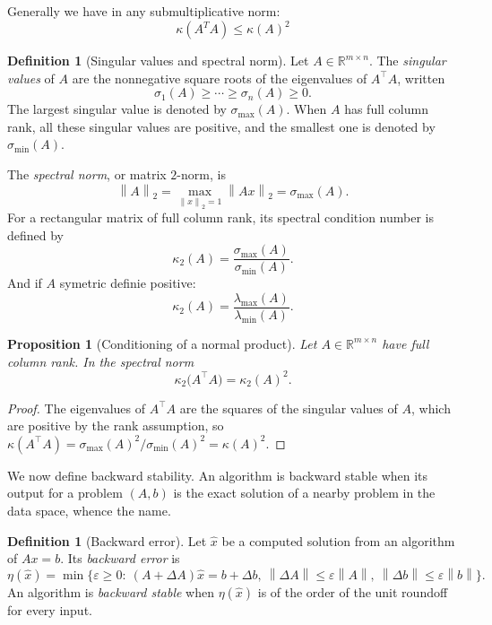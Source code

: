 \documentclass[a4paper,11pt]{book}
\theoremstyle{plain}
\newtheorem{proposition}[theorem]{Proposition}
\theoremstyle{definition}
\newtheorem{definition}[theorem]{Definition}
\theoremstyle{remark}
\numberwithin{equation}{chapter}
\numberwithin{algorithm}{chapter}
\newcommand{\R}{\mathbb{R}}
\newcommand{\norm}[1]{\left\|#1\right\|}
\begin{document}
	Generally we have in any submultiplicative norm:
	$$\kappa(A^TA) \leq \kappa(A)^2$$
	
	
	
	\begin{definition}[Singular values and spectral norm]
		Let $A\in\R^{m\times n}$. The \emph{singular values} of $A$ are the
		nonnegative square roots of the eigenvalues of $A^\top A$, written
		\[
		\sigma_1(A)\geq\cdots\geq\sigma_n(A)\geq0 .
		\]
		The largest singular value is denoted by $\sigma_{\max}(A)$.
		When $A$ has full column rank, all these singular values are positive,
		and the smallest one is denoted by $\sigma_{\min}(A)$.
		
		The \emph{spectral norm}, or matrix $2$-norm, is
		\[
		\norm{A}_2
		=\max_{\norm{x}_2=1}\norm{Ax}_2
		=\sigma_{\max}(A).
		\]
		For a rectangular matrix of full column rank, its spectral condition
		number is defined by
		\[
		\kappa_2(A)
		=\frac{\sigma_{\max}(A)}{\sigma_{\min}(A)}.
		\]
		And if $A$ symetric definie positive:
		\[
		\kappa_2(A)
		=\frac{\lambda_{\max}(A)}{\lambda_{\min}(A)}.
		\]
		
	\end{definition}
	
	
	\begin{proposition}[Conditioning of a normal product]
		Let $A\in\R^{m\times n}$ have full column rank. In the spectral norm
		\begin{equation}
			\kappa_2\bigl(A^\top A\bigr)=\kappa_2(A)^2 .
		\end{equation}
	\end{proposition}
	\begin{proof}
		The eigenvalues of $A^\top A$ are the squares of the singular values of $A$,
		which are positive by the rank assumption, so
		$\kappa(A^\top A)=\sigma_{\max}(A)^2/\sigma_{\min}(A)^2=\kappa(A)^2$.
	\end{proof}
	
	We now define backward stability. An algorithm is backward stable when its
	output for a problem $(A,b)$ is the exact solution of a nearby problem in the
	data space, whence the name.
	\begin{definition}[Backward error]
		Let $\hat x$ be a computed solution from an algorithm of $Ax=b$. Its \emph{backward error} is
		\begin{equation}
			\eta(\hat x)=\min\bigl\{\varepsilon\geq0:\ (A+\Delta A)\hat x=b+\Delta b,\
			\norm{\Delta A}\leq\varepsilon\norm{A},\
			\norm{\Delta b}\leq\varepsilon\norm{b}\bigr\} .
		\end{equation}
		An algorithm is \emph{backward stable} when $\eta(\hat x)$ is of the order of
		the unit roundoff 	 for every input.
	\end{definition}
	
\end{document}
